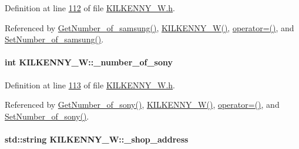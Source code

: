 Definition at line \hyperlink{_k_i_l_k_e_n_n_y___w_8h_source_l00112}{112} of file \hyperlink{_k_i_l_k_e_n_n_y___w_8h_source}{K\+I\+L\+K\+E\+N\+N\+Y\+\_\+\+W.\+h}.



Referenced by \hyperlink{_k_i_l_k_e_n_n_y___w_8cpp_source_l00105}{Get\+Number\+\_\+of\+\_\+samsung()}, \hyperlink{_k_i_l_k_e_n_n_y___w_8h_source_l00024}{K\+I\+L\+K\+E\+N\+N\+Y\+\_\+\+W()}, \hyperlink{_k_i_l_k_e_n_n_y___w_8h_source_l00075}{operator=()}, and \hyperlink{_k_i_l_k_e_n_n_y___w_8cpp_source_l00101}{Set\+Number\+\_\+of\+\_\+samsung()}.

\paragraph[{\texorpdfstring{\+\_\+number\+\_\+of\+\_\+sony}{_number_of_sony}}]{\setlength{\rightskip}{0pt plus 5cm}int K\+I\+L\+K\+E\+N\+N\+Y\+\_\+\+W\+::\+\_\+number\+\_\+of\+\_\+sony\hspace{0.3cm}{\ttfamily [private]}}\hypertarget{class_k_i_l_k_e_n_n_y___w_a9b12aacf712ccf9e082daf450bbfbe8d_a9b12aacf712ccf9e082daf450bbfbe8d}{}\label{class_k_i_l_k_e_n_n_y___w_a9b12aacf712ccf9e082daf450bbfbe8d_a9b12aacf712ccf9e082daf450bbfbe8d}


Definition at line \hyperlink{_k_i_l_k_e_n_n_y___w_8h_source_l00113}{113} of file \hyperlink{_k_i_l_k_e_n_n_y___w_8h_source}{K\+I\+L\+K\+E\+N\+N\+Y\+\_\+\+W.\+h}.



Referenced by \hyperlink{_k_i_l_k_e_n_n_y___w_8cpp_source_l00097}{Get\+Number\+\_\+of\+\_\+sony()}, \hyperlink{_k_i_l_k_e_n_n_y___w_8h_source_l00024}{K\+I\+L\+K\+E\+N\+N\+Y\+\_\+\+W()}, \hyperlink{_k_i_l_k_e_n_n_y___w_8h_source_l00075}{operator=()}, and \hyperlink{_k_i_l_k_e_n_n_y___w_8cpp_source_l00093}{Set\+Number\+\_\+of\+\_\+sony()}.

\paragraph[{\texorpdfstring{\+\_\+shop\+\_\+address}{_shop_address}}]{\setlength{\rightskip}{0pt plus 5cm}std\+::string K\+I\+L\+K\+E\+N\+N\+Y\+\_\+\+W\+::\+\_\+shop\+\_\+address\hspace{0.3cm}{\ttfamily [private]}}\hypertarget{class_k_i_l_k_e_n_n_y___w_a278c416a60d21ee6ffa400f6d1348fd5_a278c416a60d21ee6ffa400f6d1348fd5}{}\label{class_k_i_l_k_e_n_n_y___w_a278c416a60d21ee6ffa400f6d1348fd5_a278c416a60d21ee6ffa400f6d1348fd5}


